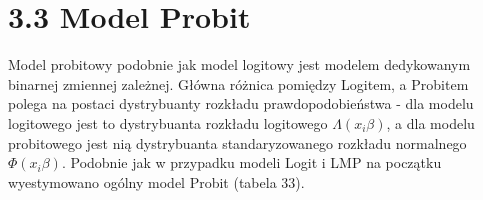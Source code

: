 \section*{3.3 Model Probit}

Model probitowy podobnie jak model logitowy jest modelem dedykowanym binarnej zmiennej zależnej. Główna różnica pomiędzy Logitem, a Probitem polega na postaci dystrybuanty rozkładu prawdopodobieństwa - dla modelu logitowego jest to dystrybuanta rozkładu logitowego $\Lambda(x_i\beta)$, a dla modelu probitowego jest nią dystrybuanta standaryzowanego rozkładu normalnego $\Phi(x_i\beta)$. Podobnie jak w przypadku modeli Logit i LMP na początku wyestymowano ogólny model Probit (tabela 33).

